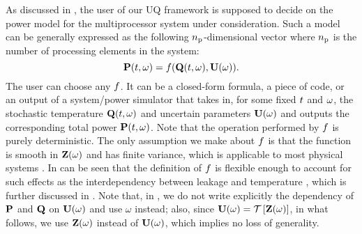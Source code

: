 As discussed in , the user of our UQ framework is supposed to decide on the power model for the multiprocessor system under consideration. Such a model can be generally expressed as the following ${n_\text{p}}$-dimensional vector where ${n_\text{p}}$ is the number of processing elements in the system:
\begin{equation} \elabel{power-model}
  \vP(\t, \o) = \f(\vTO(\t, \o), \vU(\o)).
\end{equation}
The user can choose any $f$. It can be a closed-form formula, a piece of code, or an output of a system/power simulator that takes in, for some fixed $t$ and $\omega$, the stochastic temperature $\mathbf{Q}(t, \omega)$ and uncertain parameters $\mathbf{U}(\omega)$ and outputs the corresponding total power $\mathbf{P}(t, \omega)$. Note that the operation performed by $f$ is purely deterministic. The only assumption we make about $f$ is that the function is smooth in $\mathbf{Z}(\omega)$ and has finite variance, which is applicable to most physical systems \cite{xiu2010}. In can be seen that the definition of $f$ is flexible enough to account for such effects as the interdependency between leakage and temperature \cite{srivastava2010, liu2007}, which is further discussed in . Note that, in , we do not write explicitly the dependency of $\mathbf{P}$ and $\mathbf{Q}$ on $\mathbf{U}(\omega)$ and use $\omega$ instead; also, since $\vU(\o) = \oTransform{\vZ(\o)}$, in what follows, we use $\mathbf{Z}(\omega)$ instead of $\mathbf{U}(\omega)$, which implies no loss of generality.

